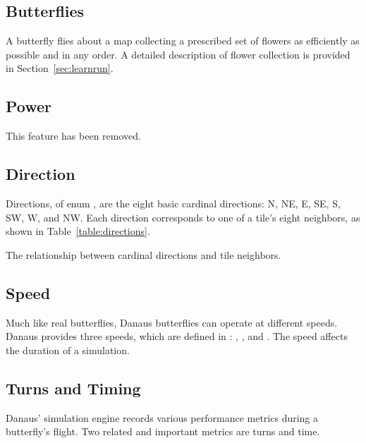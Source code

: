 \documentclass{pset}
\newcommand{\removed}{This feature has been removed.}
\begin{document}
\ifx \BUTTERFLIES \undefined \else
\subsection{Butterflies}
A butterfly flies about a map collecting a prescribed set of flowers as
efficiently as possible and in any order. A detailed description of flower
collection is provided in Section~\ref{sec:learnrun}.
\fi

\ifx \POWER \undefined \else
\subsection{Power}
\removed{}
\fi

\ifx \DIRECTION \undefined \else
\subsection{Direction}
Directions, of enum , are the eight basic cardinal directions:
N, NE, E, SE, S, SW, W, and NW\@. Each direction corresponds to one of a tile's
eight neighbors, as shown in Table~\ref{table:directions}.

\begin{table}[H]
  \centering
  \caption{The relationship between cardinal directions and tile neighbors.}
  \label{table:directions}
\end{table}
\fi

\ifx \SPEED \undefined \else
\subsection{Speed}
Much like real butterflies, Danaus butterflies can operate at different speeds.
Danaus provides three speeds, which are defined in :
, , and . The speed affects the duration of
a simulation. 
\fi

\ifx \TURNSTIMING \undefined \else 
\subsection{Turns and Timing}\label{sec:metrics}
Danaus' simulation engine records various performance metrics during a
butterfly's flight. Two related and important metrics are turns and time.
\end{document}
